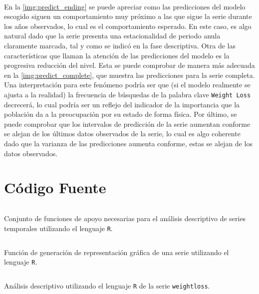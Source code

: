 \documentclass[a4paper, spanish]{article}
\begin{document}
    \paragraph{}
    En la \autoref{img:predict_ending} se puede apreciar como las predicciones del modelo escogido siguen un comportamiento muy próximo a las que sigue la serie durante los años observados, lo cual es el comportamiento esperado. En este caso, es algo natural dado que la serie presenta una estacionalidad de periodo anula claramente marcada, tal y como se indicó en la fase descriptiva. Otra de las características que llaman la atención de las predicciones del modelo es la progresiva reducción del nivel. Esta se puede comprobar de manera más adecuada en la \autoref{img:predict_complete}, que muestra las predicciones para la serie completa. Una interpretación para este fenómeno podría ser que (si el modelo realmente se ajusta a la realidad) la frecuencia de búsquedas de la palabra clave \texttt{Weight Loss} decrecerá, lo cual podría ser un reflejo del indicador de la importancia que la población da a la preocupación por su estado de forma física. Por último, se puede comprobar que los intervalos de predicción de la serie aumentan conforme se alejan de los últimos datos observados de la serie, lo cual es algo coherente dado que la varianza de las predicciones aumenta conforme, estas se alejan de los datos observados.

  \clearpage
  \appendix
  \section{Código Fuente}
  \label{sec:code}

    \begin{listing}[H]
      \centering
      \inputminted{R}{./res/code/functions.r}
      \caption{Conjunto de funciones de apoyo necesarias para el análisis descriptivo de series temporales utilizando el lenguaje \texttt{R}.}
      \label{code:functions_r}
    \end{listing}

    \begin{listing}[H]
      \centering
      \inputminted{R}{./res/code/plotting.r}
      \caption{Función de generación de representación gráfica de una serie utilizando el lenguaje \texttt{R}.}
      \label{code:plotting_r}
    \end{listing}

    \begin{listing}[H]
      \centering
      \inputminted{R}{./res/code/descriptive.r}
      \caption{Análisis descriptivo utilizando el lenguaje \texttt{R} de la serie \texttt{weightloss}.}
      \label{code:descriptive_r}
    \end{listing}
\end{document}
